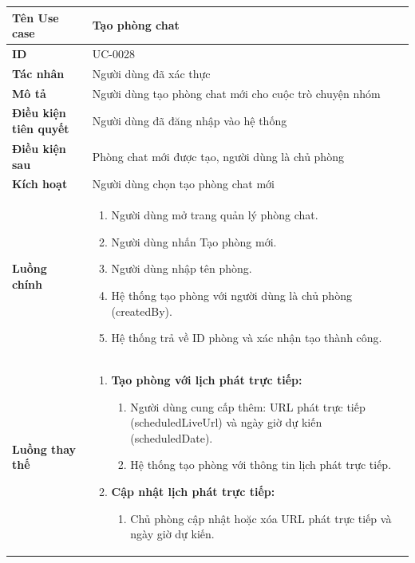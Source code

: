 {
\renewcommand{\arraystretch}{1.5}

\begin{tabularx}{\textwidth}{|>{\raggedright\arraybackslash}X|>{\raggedright\arraybackslash}X|}
\hline
\textbf{Tên Use case} & Tạo phòng chat \\
\hline
\textbf{ID} & UC-0028 \\
\hline
\textbf{Tác nhân} & Người dùng đã xác thực \\
\hline
\textbf{Mô tả} & Người dùng tạo phòng chat mới cho cuộc trò chuyện nhóm \\
\hline
\textbf{Điều kiện tiên quyết} & Người dùng đã đăng nhập vào hệ thống \\
\hline
\textbf{Điều kiện sau} & Phòng chat mới được tạo, người dùng là chủ phòng \\
\hline
\textbf{Kích hoạt} & Người dùng chọn tạo phòng chat mới \\
\hline
\textbf{Luồng chính} &
\begin{enumerate}
    \item Người dùng mở trang quản lý phòng chat.
    \item Người dùng nhấn Tạo phòng mới.
    \item Người dùng nhập tên phòng.
    \item Hệ thống tạo phòng với người dùng là chủ phòng (createdBy).
    \item Hệ thống trả về ID phòng và xác nhận tạo thành công.
\end{enumerate} \\
\hline
\textbf{Luồng thay thế} &
\begin{enumerate}
    \item \textbf{Tạo phòng với lịch phát trực tiếp:}
    \begin{enumerate}
        \item[3A.] Người dùng cung cấp thêm: URL phát trực tiếp (scheduledLiveUrl) và ngày giờ dự kiến (scheduledDate).
        \item[4A.] Hệ thống tạo phòng với thông tin lịch phát trực tiếp.
    \end{enumerate}
    \item \textbf{Cập nhật lịch phát trực tiếp:}
    \begin{enumerate}
        \item[5B.] Chủ phòng cập nhật hoặc xóa URL phát trực tiếp và ngày giờ dự kiến.
    \end{enumerate}
\end{enumerate} \\

\end{tabularx}}
